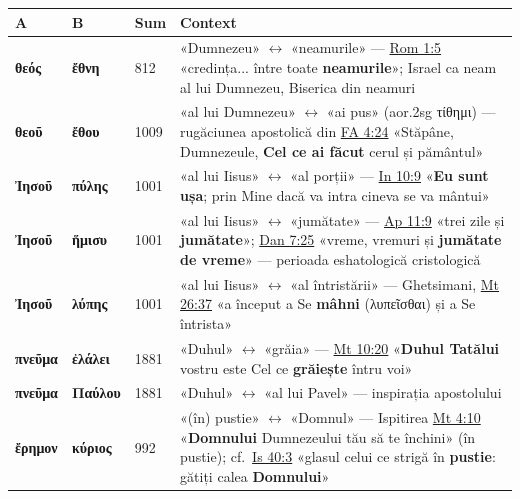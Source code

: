 \documentclass[12pt,a4paper,twoside,openany]{book}
\begin{document}
\begin{center}
\footnotesize
\begin{tabular}{L{2.2cm}L{2.2cm}C{0.8cm}L{8cm}}
\toprule
{}
\textbf{A} & \textbf{B} & \textbf{Sum} & \textbf{Context} \\
\midrule
\textbf{θεός} & \textbf{ἔθνη} & 812 & «Dumnezeu» $\leftrightarrow$ «neamurile» --- \href{https://bibliaortodoxa.ro/carte.php?id=52\&cap=1\#5}{Rom 1:5} «credința... între toate \textbf{neamurile}»; Israel ca neam al lui Dumnezeu, Biserica din neamuri \\
\textbf{θεοῦ} & \textbf{ἔθου} & 1009 & «al lui Dumnezeu» $\leftrightarrow$ «ai pus» (aor.2sg τίθημι) --- rugăciunea apostolică din \href{https://bibliaortodoxa.ro/carte.php?id=51\&cap=4\#24}{FA 4:24} «Stăpâne, Dumnezeule, \textbf{Cel ce ai făcut} cerul și pământul» \\
\textbf{Ἰησοῦ} & \textbf{πύλης} & 1001 & «al lui Iisus» $\leftrightarrow$ «al porții» --- \href{https://bibliaortodoxa.ro/carte.php?id=35\&cap=10\#9}{In 10:9} «\textbf{Eu sunt ușa}; prin Mine dacă va intra cineva se va mântui» \\
\textbf{Ἰησοῦ} & \textbf{ἥμισυ} & 1001 & «al lui Iisus» $\leftrightarrow$ «jumătate» --- \href{https://bibliaortodoxa.ro/carte.php?id=78\&cap=11\#9}{Ap 11:9} «trei zile și \textbf{jumătate}»; \href{https://bibliaortodoxa.ro/carte.php?id=16\&cap=7\#25}{Dan 7:25} «vreme, vremuri și \textbf{jumătate de vreme}» --- perioada eshatologică cristologică \\
\textbf{Ἰησοῦ} & \textbf{λύπης} & 1001 & «al lui Iisus» $\leftrightarrow$ «al întristării» --- Ghetsimani, \href{https://bibliaortodoxa.ro/carte.php?id=55\&cap=26\#37}{Mt 26:37} «a început a Se \textbf{mâhni} (λυπεῖσθαι) și a Se întrista» \\
\textbf{πνεῦμα} & \textbf{ἐλάλει} & 1881 & «Duhul» $\leftrightarrow$ «grăia» --- \href{https://bibliaortodoxa.ro/carte.php?id=55\&cap=10\#20}{Mt 10:20} «\textbf{Duhul Tatălui} vostru este Cel ce \textbf{grăiește} întru voi» \\
\textbf{πνεῦμα} & \textbf{Παύλου} & 1881 & «Duhul» $\leftrightarrow$ «al lui Pavel» --- inspirația apostolului \\
\textbf{ἔρημον} & \textbf{κύριος} & 992 & «(în) pustie» $\leftrightarrow$ «Domnul» --- Ispitirea \href{https://bibliaortodoxa.ro/carte.php?id=55\&cap=4\#10}{Mt 4:10} «\textbf{Domnului} Dumnezeului tău să te închini» (în pustie); cf.~\href{https://bibliaortodoxa.ro/carte.php?id=43\&cap=40\#3}{Is 40:3} «glasul celui ce strigă în \textbf{pustie}: gătiți calea \textbf{Domnului}» \\

\end{tabular}
\end{center}
\end{document}
